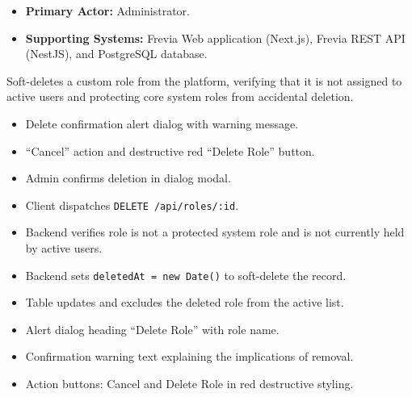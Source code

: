 
\begin{itemize}[leftmargin=1.6em,topsep=3pt,itemsep=2pt,parsep=0pt,label=$\bullet$]
    \item \textbf{Primary Actor:} Administrator.
    \item \textbf{Supporting Systems:} Frevia Web application (Next.js), Frevia REST API (NestJS), and PostgreSQL database.
\end{itemize}

\noindent Soft-deletes a custom role from the platform, verifying that it is not assigned to active users and protecting core system roles from accidental deletion.

\begin{itemize}[leftmargin=1.6em,topsep=3pt,itemsep=2pt,parsep=0pt,label=$\bullet$]
    \item Delete confirmation alert dialog with warning message.
    \item ``Cancel'' action and destructive red ``Delete Role'' button.
\end{itemize}

\begin{itemize}[leftmargin=1.6em,topsep=3pt,itemsep=2pt,parsep=0pt,label=$\bullet$]
    \item Admin confirms deletion in dialog modal.
    \item Client dispatches \texttt{DELETE /api/roles/:id}.
    \item Backend verifies role is not a protected system role and is not currently held by active users.
    \item Backend sets \texttt{deletedAt = new Date()} to soft-delete the record.
    \item Table updates and excludes the deleted role from the active list.
\end{itemize}

\begin{itemize}[leftmargin=1.6em,topsep=3pt,itemsep=2pt,parsep=0pt,label=$\bullet$]
    \item Alert dialog heading ``Delete Role'' with role name.
    \item Confirmation warning text explaining the implications of removal.
    \item Action buttons: Cancel and Delete Role in red destructive styling.
\end{itemize}

